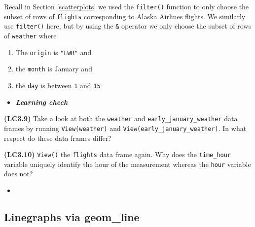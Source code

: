 \documentclass[12pt, krantz2,]{krantz}
\makeatletter
\newenvironment{Shaded}{\begin{snugshade}}{\end{snugshade}}
\newcommand{\DecValTok}[1]{\textcolor[rgb]{0.06,0.06,0.06}{#1}}
\newcommand{\KeywordTok}[1]{\textcolor[rgb]{0.27,0.27,0.27}{\textbf{#1}}}
\newcommand{\NormalTok}[1]{#1}
\newcommand{\OperatorTok}[1]{\textcolor[rgb]{0.43,0.43,0.43}{\textbf{#1}}}
\newcommand{\StringTok}[1]{\textcolor[rgb]{0.5,0.5,0.5}{#1}}
\providecommand{\tightlist}{%
  \setlength{\itemsep}{0pt}\setlength{\parskip}{0pt}}
\newenvironment{kframe}{%
\medskip{}
\setlength{\fboxsep}{.8em}
 \def\at@end@of@kframe{}%
 \ifinner\ifhmode%
  \def\at@end@of@kframe{\end{minipage}}%
  \begin{minipage}{\columnwidth}%
 \fi\fi%
 \def\FrameCommand##1{\hskip\@totalleftmargin \hskip-\fboxsep
 \colorbox{shadecolor}{##1}\hskip-\fboxsep
     \hskip-\linewidth \hskip-\@totalleftmargin \hskip\columnwidth}%
 \MakeFramed {\advance\hsize-\width
   \@totalleftmargin\z@ \linewidth\hsize
   \@setminipage}}%
 {\par\unskip\endMakeFramed%
 \at@end@of@kframe}
\renewenvironment{Shaded}{\begin{kframe}}{\end{kframe}}
\newenvironment{rmdblock}[1]
  {\begin{shaded*}
  \begin{itemize}
  \renewcommand{\labelitemi}{
    \raisebox{-.7\height}[0pt][0pt]{
    }
  }
  \item
  }
  {
  \end{itemize}
  \end{shaded*}
  }
\newenvironment{learncheck}
  {\begin{rmdblock}{warning}}
  {\end{rmdblock}}
\makeatother
\begin{document}
Recall in Section \ref{scatterplots} we used the \texttt{filter()} function to only choose the subset of rows of \texttt{flights} corresponding to Alaska Airlines flights. We similarly use \texttt{filter()} here, but by using the \texttt{\&} operator we only choose the subset of rows of \texttt{weather} where

\begin{enumerate}
\def\labelenumi{\arabic{enumi}.}
\tightlist
\item
  The \texttt{origin} is \texttt{"EWR"} and
\item
  the \texttt{month} is January and
\item
  the \texttt{day} is between \texttt{1} and \texttt{15}
\end{enumerate}

\begin{Shaded}
\end{Shaded}

\begin{learncheck}
\textbf{\emph{Learning check}}
\end{learncheck}

\textbf{(LC3.9)} Take a look at both the \texttt{weather} and \texttt{early\_january\_weather} data frames by running \texttt{View(weather)} and \texttt{View(early\_january\_weather)}. In what respect do these data frames differ?

\textbf{(LC3.10)} \texttt{View()} the \texttt{flights} data frame again. Why does the \texttt{time\_hour} variable uniquely identify the hour of the measurement whereas the \texttt{hour} variable does not?

\begin{learncheck}

\end{learncheck}

\hypertarget{geomline}{%
\subsection{Linegraphs via geom\_line}\label{geomline}}
\end{document}
